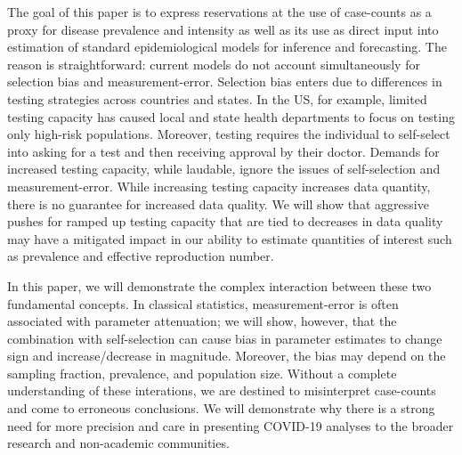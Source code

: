 \documentclass[aoas]{amsart}
\begin{document}
The goal of this paper is to express reservations at the use of case-counts as a proxy for disease prevalence and intensity as well as its use as direct input into estimation of standard epidemiological models for inference and forecasting.  The reason is straightforward: current models do not account simultaneously for selection bias and measurement-error. Selection bias enters due to differences in testing strategies across countries and states.  In the US, for example, limited testing capacity has caused local and state health departments to focus on testing only high-risk populations.  Moreover, testing requires the individual to self-select into asking for a test and then receiving approval by their doctor.  Demands for increased testing capacity, while laudable, ignore the issues of self-selection and measurement-error. While increasing testing capacity increases data quantity, there is no guarantee for increased data quality.  We will show that aggressive pushes for ramped up testing capacity that are tied to decreases in data quality may have a mitigated impact  in our ability to estimate quantities of interest such as prevalence and effective reproduction number.

In this paper, we will demonstrate the complex interaction between these two fundamental concepts.  In classical statistics, measurement-error is often associated with parameter attenuation; we will show, however, that the combination with self-selection can cause bias in parameter estimates to change sign and increase/decrease in magnitude.  Moreover, the bias may depend on the sampling fraction, prevalence, and population size.  Without a complete understanding of these interations, we are destined to misinterpret case-counts and come to erroneous conclusions.   We will demonstrate why there is a strong need for more precision and care in presenting COVID-19 analyses to the broader research and non-academic communities.




\end{document}
